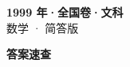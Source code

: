 \documentclass[zihao=-4, a4paper]{ctexart}
\begin{document}
\begin{center}
  {\Large\bfseries 1999 年·全国卷·文科}\\[4pt]
  {\large 数学 · 简答版}
\end{center}
\medskip
{}

\clearpage
{}
\begin{center}{\Large\bfseries 答案速查}\end{center}
\medskip

\end{document}
